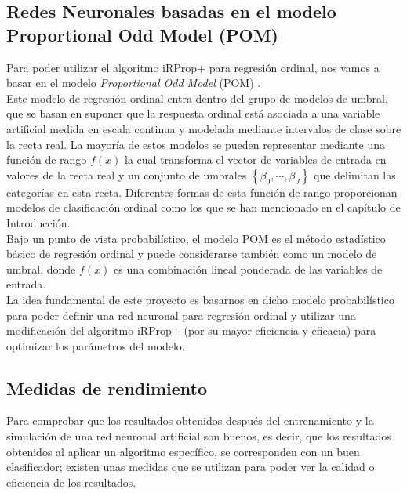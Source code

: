 		\subsection{Redes Neuronales basadas en el modelo Proportional Odd Model (POM)}

			Para poder utilizar el algoritmo iRProp+ para regresión ordinal, nos vamos a basar en el modelo \textit{Proportional Odd Model} (POM) \cite{Mcc80}.\\

			Este modelo de regresión ordinal entra dentro del grupo de modelos de umbral, que se basan en suponer que la respuesta ordinal está asociada a una variable artificial medida en escala continua y modelada mediante intervalos de clase sobre la recta real. La mayoría de estos modelos se pueden representar mediante una función de rango $f(x)$ la cual transforma el vector de variables de entrada en valores de la recta real y un conjunto de umbrales $\left\{ \beta_0,\cdots,\beta_J \right\} $ que delimitan las categorías en esta recta. Diferentes formas de esta función de rango proporcionan modelos de clasificación ordinal como los que se han mencionado en el capítulo de Introducción.\\

			Bajo un punto de vista probabilístico, el modelo POM \cite{Mcc80} es el método estadístico básico de regresión ordinal y puede considerarse también como un modelo de umbral, donde $f(x)$ es una combinación lineal ponderada de las variables de entrada.\\

			La idea fundamental de este proyecto es basarnos en dicho modelo probabilístico para poder definir una red neuronal para regresión ordinal y utilizar una modificación del algoritmo iRProp+ (por su mayor eficiencia y eficacia) para optimizar los parámetros del modelo.\\
		
		\subsection{Medidas de rendimiento}
		
			Para comprobar que los resultados obtenidos después del entrenamiento y la simulación de una red neuronal artificial son buenos, es decir, que los resultados obtenidos al aplicar un algoritmo específico, se corresponden con un buen clasificador; existen unas medidas que se utilizan para poder ver la calidad o eficiencia de los resultados.\\
			
